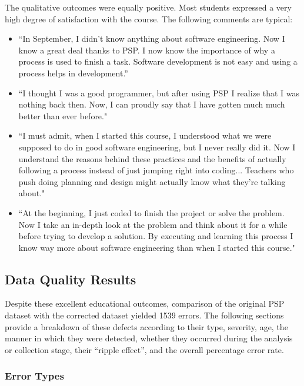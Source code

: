 The qualitative outcomes were equally positive. Most students expressed a
very high degree of satisfaction with the course. The following
comments are typical:

\begin{itemize}

\item ``In September, I didn't know anything about software
engineering.  Now I know a great deal thanks to PSP.  I now
know the importance of why a process is used to finish a
task.  Software development is not easy and using a process
helps in development.'' 

\item ``I thought I was a good programmer, but after using
PSP I realize that I was nothing back then.  Now, I can
proudly say that I have gotten much much better than ever
before."

\item ``I must admit, when I started this course, I understood what we were
  supposed to do in good software engineering, but I never really did it.
  Now I understand the reasons behind these practices and the benefits of
  actually following a process instead of just jumping right into coding...
  Teachers who push doing planning and design might actually know what
  they're talking about."

\item ``At the beginning, I just coded to finish the project
or solve the problem. Now I take an in-depth look at the
problem and think about it for a while before trying to
develop a solution.  By executing and learning this process
I know way more about software engineering than when I
started this course."

\end{itemize}


\subsection{Data Quality Results}

Despite these excellent educational outcomes, comparison of the original
PSP dataset with the corrected dataset yielded 1539 errors.  The following
sections provide a breakdown of these defects according to their type,
severity, age, the manner in which they were detected, whether they
occurred during the analysis or collection stage, their ``ripple effect'',
and the overall percentage error rate.

\subsubsection{Error Types}

